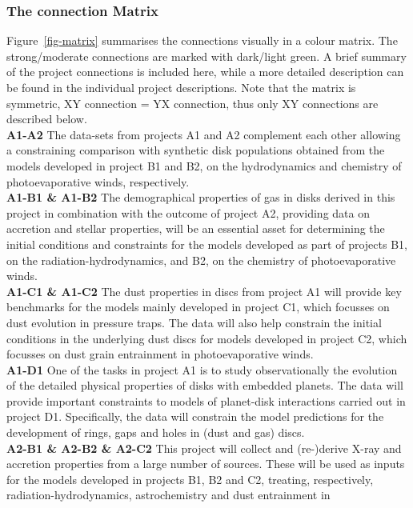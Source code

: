 \documentclass[10pt,fleqn,twoside]{article}
\begin{document}
\subsubsection{The connection Matrix}
\label{sub-matrix}
Figure~\ref{fig-matrix} summarises the connections visually in a
colour matrix. The strong/moderate connections are marked with
dark/light green. A brief summary of the project connections is
included here, while a more detailed description can be found in the
individual project descriptions. Note that the matrix is symmetric, XY connection = YX
connection, thus only XY connections are described below.   \\
{\bf A1-A2} The 
data-sets from projects A1 and A2 complement each other allowing a
constraining comparison with synthetic disk
populations obtained from the models developed in project B1 and B2,
on the hydrodynamics and chemistry of photoevaporative winds,
respectively. \\
{\bf A1-B1 \& A1-B2} The demographical properties of gas in disks
derived in this project in combination 
with the outcome of project A2, providing data on accretion and
stellar properties, will
be an essential asset for determining the initial conditions and constraints
for the models developed as part of projects B1, on the radiation-hydrodynamics, and
B2, on the chemistry of photoevaporative winds.\\
{\bf A1-C1 \& A1-C2}
The dust properties in discs from project A1 
will provide  key benchmarks for the models mainly developed in
project C1, which focusses on dust evolution in pressure traps. The
data will
also help constrain the initial conditions in the underlying dust
discs for models developed in project C2, which focusses on dust grain
entrainment in photoevaporative winds. \\
{\bf A1-D1} One of the tasks
in project A1 is to study observationally the 
evolution of the detailed physical properties of disks with embedded
planets. The data will provide important constraints to models of planet-disk
interactions carried out in project D1. Specifically, the data will
constrain the model 
predictions for the development of rings, gaps and holes in (dust and
gas) discs. \\
{\bf A2-B1 \& A2-B2 \& A2-C2} This project will collect
and (re-)derive X-ray and accretion properties 
from a large number of sources. These will be used as inputs for the models
developed in projects B1, B2 and C2, treating, respectively,
radiation-hydrodynamics, astrochemistry and dust entrainment in
\end{document}
